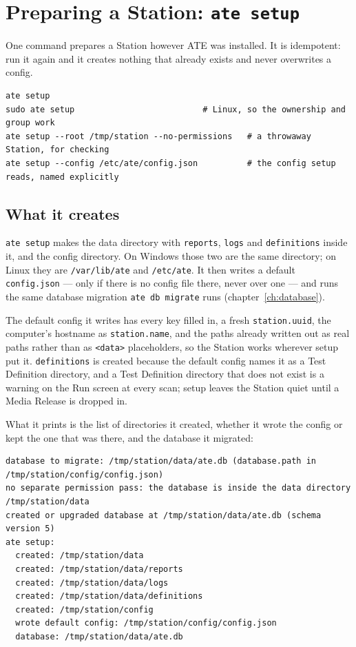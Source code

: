 \chapter{Preparing a Station: \texttt{ate setup}}\label{ch:setup}

One command prepares a Station however ATE was installed. It is idempotent: run it again and it
creates nothing that already exists and never overwrites a config.

\begin{lstlisting}[language=ATEShell]
ate setup
sudo ate setup                          # Linux, so the ownership and group work
ate setup --root /tmp/station --no-permissions   # a throwaway Station, for checking
ate setup --config /etc/ate/config.json          # the config setup reads, named explicitly
\end{lstlisting}

\section{What it creates}

\texttt{ate setup} makes the data directory with \texttt{reports}, \texttt{logs} and
\texttt{definitions} inside it, and the config directory. On Windows those two are the same
directory; on Linux they are \texttt{/var/lib/ate} and \texttt{/etc/ate}. It then writes a default
\texttt{config.json} --- only if there is no config file there, never over one --- and runs the
same database migration \texttt{ate db migrate} runs (chapter~\ref{ch:database}).

The default config it writes has every key filled in, a fresh \texttt{station.uuid}, the computer's
hostname as \texttt{station.name}, and the paths already written out as real paths rather than as
\texttt{<data>} placeholders, so the Station works wherever setup put it. \texttt{definitions} is
created because the default config names it as a Test Definition directory, and a Test Definition
directory that does not exist is a warning on the Run screen at every scan; setup leaves the
Station quiet until a Media Release is dropped in.

What it prints is the list of directories it created, whether it wrote the config or kept the one
that was there, and the database it migrated:

\begin{lstlisting}[language=ATEShell]
database to migrate: /tmp/station/data/ate.db (database.path in /tmp/station/config/config.json)
no separate permission pass: the database is inside the data directory /tmp/station/data
created or upgraded database at /tmp/station/data/ate.db (schema version 5)
ate setup:
  created: /tmp/station/data
  created: /tmp/station/data/reports
  created: /tmp/station/data/logs
  created: /tmp/station/data/definitions
  created: /tmp/station/config
  wrote default config: /tmp/station/config/config.json
  database: /tmp/station/data/ate.db
\end{lstlisting}

